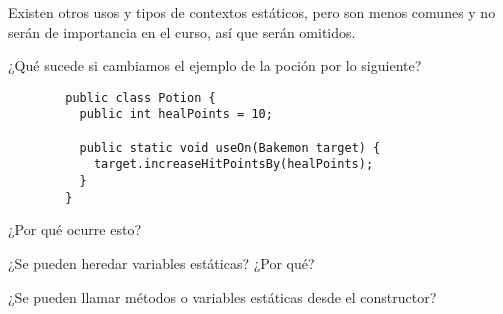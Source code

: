    Existen otros usos y tipos de contextos estáticos, pero son menos comunes y no serán de 
    importancia en el curso, así que serán omitidos.

    \begin{exercise}
      ¿Qué sucede si cambiamos el ejemplo de la poción por lo siguiente?
      \begin{verbatim}
        public class Potion {
          public int healPoints = 10;
  
          public static void useOn(Bakemon target) {
            target.increaseHitPointsBy(healPoints);
          }
        }
      \end{verbatim}

      ¿Por qué ocurre esto?
    \end{exercise}

    \begin{exercise}
      ¿Se pueden heredar variables estáticas?
      ¿Por qué?
    \end{exercise}

    \begin{exercise}
      ¿Se pueden llamar métodos o variables estáticas desde el constructor?
    \end{exercise}
